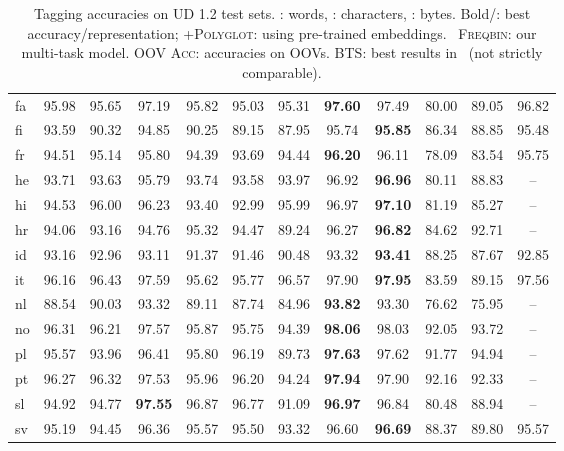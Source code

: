 \documentclass[11pt]{article}
\begin{document}
\begin{table*}[h!t]
{\begin{tabular}{lcc|cccc|cc|cc|c}
fa	& 95.98 & 95.65 &  97.19 & 95.82	 & 95.03 & 95.31 & \textbf{97.60} & 97.49& 80.00& 89.05  & 96.82\\
fi	& 93.59 & 90.32 &  94.85 & 90.25	 & 89.15 & 87.95 & 95.74 & \textbf{95.85}& 86.34 & 88.85 & 95.48\\
fr	& 94.51 & 95.14 &  95.80 & 94.39	 & 93.69 & 94.44 & \textbf{96.20} & 96.11& 78.09 &  83.54 & 95.75\\
he	& 93.71 & 93.63 &  95.79 & 93.74	 & 93.58 & 93.97 & 96.92 & \textbf{96.96}& 80.11 & 88.83 & --\\
hi	& 94.53 & 96.00 &  96.23 & 93.40 & 92.99 & 95.99 & 96.97 & \textbf{97.10}& 81.19& 85.27 & --\\
hr	& 94.06 & 93.16 &  94.76 &95.32 & 94.47 & 89.24 & 96.27 & \textbf{96.82}& 84.62& 92.71 & --\\
id	& 93.16 & 92.96 &  93.11 & 91.37 & 91.46 & 90.48 & 93.32 & \textbf{93.41}& 88.25 & 87.67 & 92.85\\
it	& 96.16 & 96.43 &  97.59 & 95.62 & 95.77 & 96.57 & 97.90 & \textbf{97.95}& 83.59 & 89.15 & 97.56\\
nl	& 88.54 & 90.03 &  93.32 & 89.11 & 87.74 & 84.96 & \textbf{93.82} & 93.30& 76.62 & 75.95 & --\\
no	& 96.31 & 96.21 &  97.57 & 95.87	 & 95.75 & 94.39 & \textbf{98.06} & 98.03& 92.05 & 93.72  & --\\
pl	& 95.57 & 93.96 &  96.41 & 95.80 & 96.19 & 89.73 & \textbf{97.63} & 97.62& 91.77 & 94.94 & --\\
pt	& 96.27 & 96.32 &  97.53 & 95.96	& 96.20 & 94.24 & \textbf{97.94} & 97.90& 92.16 & 92.33 & --\\
sl	& 94.92 & 94.77 &  \textbf{97.55} & 96.87	 & 96.77 & 91.09 & \textbf{96.97} & 96.84& 80.48& 88.94 & --\\
sv	& 95.19 & 94.45 &  96.36 & 95.57 & 95.50 &93.32 & 96.60 & \textbf{96.69}& 88.37 & 89.80 & 95.57\\
\bottomrule

\end{tabular}
}
\caption{Tagging accuracies on UD 1.2 test sets. : words, : characters, : bytes. 
Bold/: best accuracy/representation; \textsc{+Polyglot}: using pre-trained embeddings. \
\textsc{Freqbin}: our multi-task model. \textsc{OOV Acc}: accuracies on OOVs. 
BTS: best results in~\newcite{gillick:ea:2016} (not strictly comparable). }
\label{tbl:results}
\end{table*}
\end{document}
